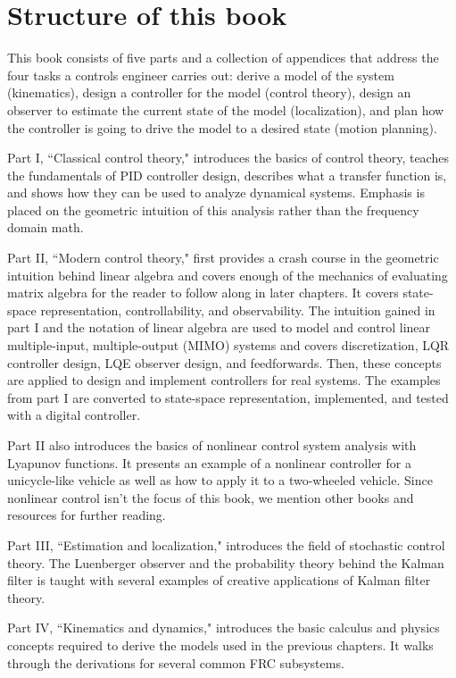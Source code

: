 \section{Structure of this book}

This book consists of five parts and a collection of appendices that address the
four tasks a controls engineer carries out: derive a model of the system
(kinematics), design a controller for the model (control theory), design an
observer to estimate the current state of the model (localization), and plan how
the controller is going to drive the model to a desired state (motion planning).

Part I, ``Classical control theory," introduces the basics of control theory,
teaches the fundamentals of PID controller design, describes what a transfer
function is, and shows how they can be used to analyze dynamical systems.
Emphasis is placed on the geometric intuition of this analysis rather than the
frequency domain math.

Part II, ``Modern control theory," first provides a crash course in the
geometric intuition behind linear algebra and covers enough of the mechanics of
evaluating matrix algebra for the reader to follow along in later chapters. It
covers state-space representation, controllability, and observability. The
intuition gained in part I and the notation of linear algebra are used to model
and control linear multiple-input, multiple-output (MIMO) systems and covers
discretization, LQR controller design, LQE observer design, and feedforwards.
Then, these concepts are applied to design and implement controllers for real
systems. The examples from part I are converted to state-space representation,
implemented, and tested with a digital controller.

Part II also introduces the basics of nonlinear control system analysis with
Lyapunov functions. It presents an example of a nonlinear controller for a
unicycle-like vehicle as well as how to apply it to a two-wheeled vehicle. Since
nonlinear control isn't the focus of this book, we mention other books and
resources for further reading.

Part III, ``Estimation and localization," introduces the field of stochastic
control theory. The Luenberger observer and the probability theory behind the
Kalman filter is taught with several examples of creative applications of Kalman
filter theory.

Part IV, ``Kinematics and dynamics," introduces the basic calculus and physics
concepts required to derive the models used in the previous chapters. It walks
through the derivations for several common FRC subsystems.

